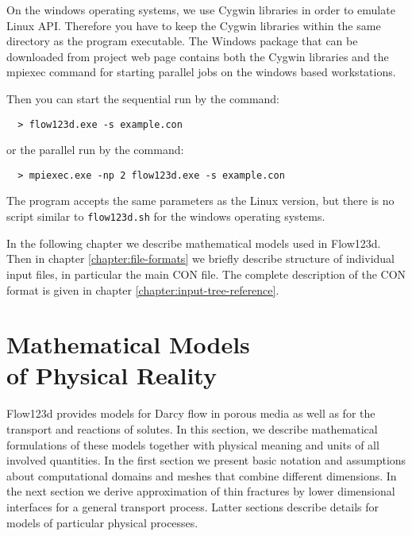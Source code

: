 \documentclass[12pt,a4paper]{report}
\begin{document}
On the windows operating systems, we use Cygwin libraries in order to emulate Linux API.
Therefore you have to keep the Cygwin libraries within the same directory as the program executable.
The Windows package that can be downloaded from project web page contains both the Cygwin libraries
and the mpiexec command for starting parallel jobs on the windows based workstations.

Then you can start the sequential run by the command:
\begin{verbatim}
  > flow123d.exe -s example.con
\end{verbatim}
or the parallel run by the command:
\begin{verbatim}
  > mpiexec.exe -np 2 flow123d.exe -s example.con
\end{verbatim}
The program accepts the same parameters as the Linux version, but there is no script similar to \verb'flow123d.sh' for the windows operating systems.






In the following chapter we describe mathematical models used in Flow123d.
Then in chapter \ref{chapter:file-formats} we briefly describe structure of individual input files, in particular the main CON file.
The complete description of the CON format is given in chapter \ref{chapter:input-tree-reference}.


\chapter[Mathematical Models of Physical Reality]{Mathematical Models \\of Physical Reality}
\label{chapter:mathematical_models}

Flow123d provides models for Darcy flow in porous media as well as for the transport and reactions of solutes. In this section, we describe 
mathematical formulations of these models together with physical meaning and units of all involved quantities. In the first section we present 
basic notation and assumptions about computational domains and meshes that combine different dimensions. In the next section we
derive approximation of thin fractures by lower dimensional interfaces for a general transport process. Latter sections describe details for models of particular
physical processes.
\end{document}
